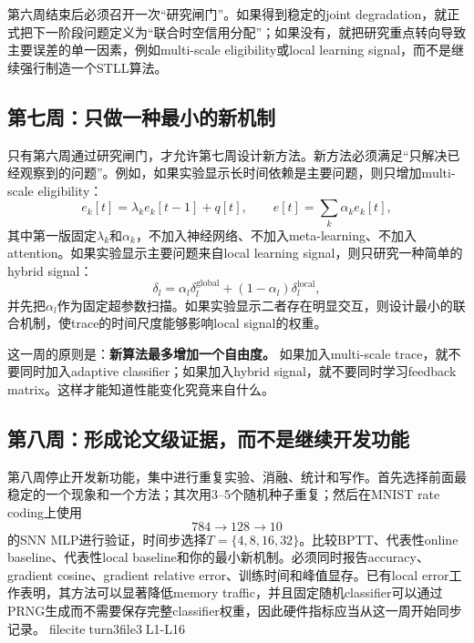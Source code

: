 \documentclass[journal,12pt,onecolumn]{IEEEtran}
\begin{document}
第六周结束后必须召开一次“研究闸门”。如果得到稳定的joint degradation，就正式把下一阶段问题定义为“联合时空信用分配”；如果没有，就把研究重点转向导致主要误差的单一因素，例如multi-scale eligibility或local learning signal，而不是继续强行制造一个STLL算法。

\subsection{第七周：只做一种最小的新机制}

只有第六周通过研究闸门，才允许第七周设计新方法。新方法必须满足“只解决已经观察到的问题”。例如，如果实验显示长时间依赖是主要问题，则只增加multi-scale eligibility：
\begin{equation}
e_k[t]=\lambda_k e_k[t-1]+q[t],
\qquad
e[t]=\sum_k\alpha_k e_k[t],
\end{equation}
其中第一版固定$\lambda_k$和$\alpha_k$，不加入神经网络、不加入meta-learning、不加入attention。如果实验显示主要问题来自local learning signal，则只研究一种简单的hybrid signal：
\begin{equation}
\delta_l
=
\alpha_l\delta_l^{\mathrm{global}}
+
(1-\alpha_l)\delta_l^{\mathrm{local}},
\end{equation}
并先把$\alpha_l$作为固定超参数扫描。如果实验显示二者存在明显交互，则设计最小的联合机制，使trace的时间尺度能够影响local signal的权重。

这一周的原则是：\textbf{新算法最多增加一个自由度。} 如果加入multi-scale trace，就不要同时加入adaptive classifier；如果加入hybrid signal，就不要同时学习feedback matrix。这样才能知道性能变化究竟来自什么。

\subsection{第八周：形成论文级证据，而不是继续开发功能}

第八周停止开发新功能，集中进行重复实验、消融、统计和写作。首先选择前面最稳定的一个现象和一个方法；其次用3--5个随机种子重复；然后在MNIST rate coding上使用
\begin{equation}
784\rightarrow128\rightarrow10
\end{equation}
的SNN MLP进行验证，时间步选择$T=\{4,8,16,32\}$。比较BPTT、代表性online baseline、代表性local baseline和你的最小新机制。必须同时报告accuracy、gradient cosine、gradient relative error、训练时间和峰值显存。已有local error工作表明，其方法可以显著降低memory traffic，并且固定随机classifier可以通过PRNG生成而不需要保存完整classifier权重，因此硬件指标应当从这一周开始同步记录。fileciteturn3file3L1-L16
\end{document}
